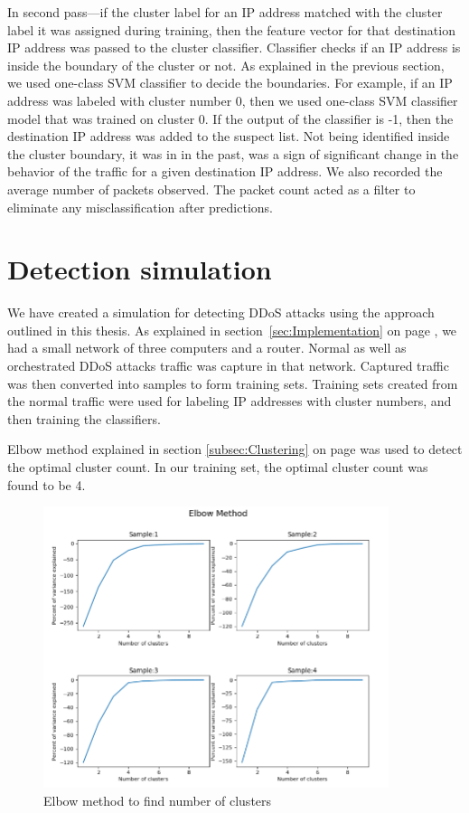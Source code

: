 \documentclass[12pt,oneside,a4paper]{article}
\begin{document}
In second pass---if the cluster label for an IP address matched with the cluster label it was assigned during training, then the feature vector for that destination IP address was passed to the cluster classifier. Classifier checks if an IP address is inside the boundary of the cluster or not. As explained in the previous section, we used one-class SVM classifier to decide the boundaries. For example, if an IP address was labeled with cluster number 0, then we used one-class SVM classifier model that was trained on cluster 0. If the output of the classifier is -1, then the destination IP address was added to the suspect list. Not being identified inside the cluster boundary, it was in in the past, was a sign of significant change in the behavior of the traffic for a given destination IP address. We also recorded the average number of packets observed. The packet count acted as a filter to eliminate any misclassification after predictions.

\pagebreak
\section{Detection simulation}

We have created a simulation for detecting DDoS attacks using the approach outlined in this thesis. As explained in section~\ref{sec:Implementation} on page \pageref{sec:Implementation}, we had a small network of three computers and a router. Normal as well as orchestrated DDoS attacks traffic was capture in that network. Captured traffic was then converted into samples to form training sets. Training sets created from the normal traffic were used for labeling IP addresses with cluster numbers, and then training the classifiers.

Elbow method explained in section \ref{subsec:Clustering} on page \pageref{subsec:Clustering} was used to detect the optimal cluster count. In our training set, the optimal cluster count was found to be 4.

\begin{figure}[H]
\centering
\includegraphics[width=0.90\textwidth]{elbow-method-applied.png}
\caption{Elbow method to find number of clusters}
\label{fig:elbow-method-applied}
\end{figure}
\end{document}
